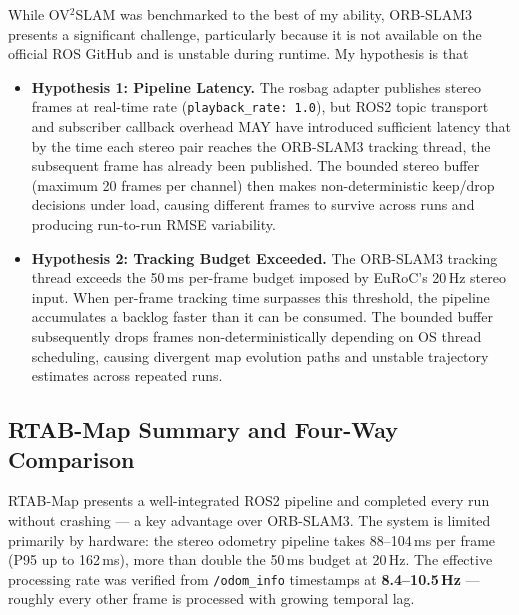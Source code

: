\documentclass[11pt]{article}
\begin{document}
While OV$^{2}$SLAM was benchmarked to the best of my ability, ORB-SLAM3 presents a significant challenge, particularly because it is not available on the official ROS GitHub and is unstable during runtime. My hypothesis is that
\begin{itemize}
    \item \textbf{Hypothesis 1: Pipeline Latency.} The rosbag adapter publishes stereo frames at real-time rate (\texttt{playback\_rate: 1.0}), but ROS2 topic transport and subscriber callback overhead MAY have introduced sufficient latency that by the time each stereo pair reaches the ORB-SLAM3 tracking thread, the subsequent frame has already been published. The bounded stereo buffer (maximum 20 frames per channel) then makes non-deterministic keep/drop decisions under load, causing different frames to survive across runs and producing run-to-run RMSE variability.

    \item \textbf{Hypothesis 2: Tracking Budget Exceeded.} The ORB-SLAM3 tracking thread exceeds the 50\,ms per-frame budget imposed by EuRoC's 20\,Hz stereo input. When per-frame tracking time surpasses this threshold, the pipeline accumulates a backlog faster than it can be consumed. The bounded buffer subsequently drops frames non-deterministically depending on OS thread scheduling, causing divergent map evolution paths and unstable trajectory estimates across repeated runs.
\end{itemize}

\subsection*{RTAB-Map Summary and Four-Way Comparison}

RTAB-Map presents a well-integrated ROS2 pipeline and completed every run without crashing — a key advantage over ORB-SLAM3. The system is limited primarily by hardware: the stereo odometry pipeline takes 88--104\,ms per frame (P95 up to 162\,ms), more than double the 50\,ms budget at 20\,Hz. The effective processing rate was verified from \texttt{/odom\_info} timestamps at \textbf{8.4--10.5\,Hz} — roughly every other frame is processed with growing temporal lag.
\end{document}
